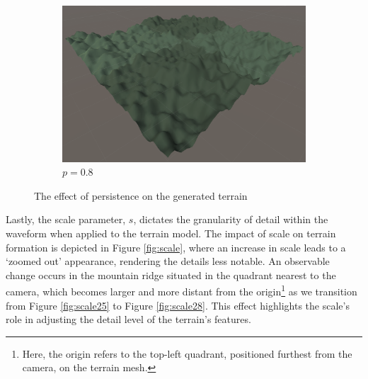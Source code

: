 \documentclass[12pt]{article}
\begin{document}
\begin{figure}[ht]
\begin{subfigure}{0.3\textwidth}
        \centering
        \includegraphics[width=\linewidth]{persistance0.8.png}
        \caption{$p=0.8$}
        \label{fig:persistence0.8}
    \end{subfigure}
    \caption{The effect of persistence on the generated terrain}
    \label{fig:persistence}
\end{figure}

Lastly, the scale parameter, \(s\), dictates the granularity of detail within the waveform when applied to the terrain model. The impact of scale on terrain formation is depicted in Figure \ref{fig:scale}, where an increase in scale leads to a `zoomed out' appearance, rendering the details less notable. An observable change occurs in the mountain ridge situated in the quadrant nearest to the camera, which becomes larger and more distant from the origin\footnote{Here, the origin refers to the top-left quadrant, positioned furthest from the camera, on the terrain mesh.} as we transition from Figure \ref{fig:scale25} to Figure \ref{fig:scale28}. This effect highlights the scale's role in adjusting the detail level of the terrain's features.
\end{document}
